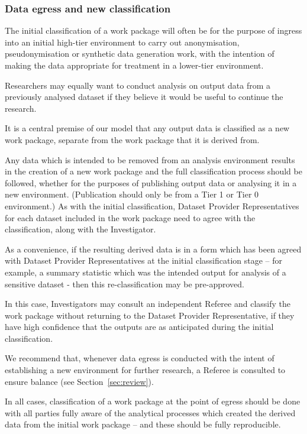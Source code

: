 \documentclass[10pt,a4paper,twocolumn]{article}
\begin{document}
\subsubsection{Data egress and new classification}
\label{sec:reclassification}

The initial classification of a work package will often be for the purpose of ingress into an initial high-tier environment to carry out anonymisation, pseudonymisation or synthetic data generation work, with the intention of making the data appropriate for treatment in a lower-tier environment. 

Researchers may equally want to conduct analysis on output data from a previously analysed dataset if they believe it would be useful to continue the research.

It is a central premise of our model that any output data is classified as a new work package, separate from the work package that it is derived from.

Any data which is intended to be removed from an analysis environment results in the creation of a new work package and the full classification process should be followed, whether for the purposes of publishing output data or analysing it in a new environment. (Publication should only be from a Tier 1 or Tier 0 environment.) As with the initial classification, Dataset Provider Representatives for each dataset included in the work package need to agree with the classification, along with the Investigator.

As a convenience, if the resulting derived data is in a form which has been agreed with Dataset Provider Representatives at the initial classification stage – for example, a summary statistic which was the intended output for analysis of a sensitive dataset - then this re-classification may be pre-approved.

In this case, Investigators may consult an independent Referee and classify the work package without returning to the Dataset Provider Representative, if they have high confidence that the outputs are as anticipated during the initial classification.

We recommend that, whenever data egress is conducted with the intent of establishing a new environment for further research, a Referee is consulted to ensure balance (see Section~\ref{sec:review}).

In all cases, classification of a work package at the point of egress should be done with all parties fully aware of the analytical processes which created the derived data from the initial work package – and these should be fully reproducible.
\end{document}
